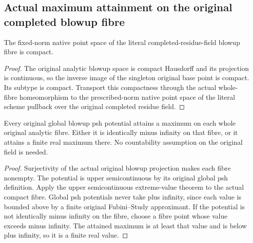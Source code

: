 \subsection{Actual maximum attainment on the original completed blowup fibre}

\begin{lemma}
\label{lem:fc-whole-completed-fibre-compact}
\leanok
The fixed-norm native point space of the literal completed-residue-field
blowup fibre is compact.
\end{lemma}
\begin{proof}
The original analytic blowup space is compact Hausdorff and its projection is
continuous, so the inverse image of the singleton original base point is
compact. Its subtype is compact. Transport this compactness through the
actual whole-fibre homeomorphism to the prescribed-norm native point space
of the literal scheme pullback over the original completed residue field.
\end{proof}

\begin{lemma}
\label{lem:fc-original-fibre-finite-maximum-attainment}
\leanok
Every original global blowup psh potential attains a maximum on each whole
original analytic fibre. Either it is identically minus infinity on that
fibre, or it attains a finite real maximum there. No countability assumption
on the original field is needed.
\end{lemma}
\begin{proof}
Surjectivity of the actual original blowup projection makes each fibre
nonempty. The potential is upper semicontinuous by its original global psh
definition. Apply the upper semicontinuous extreme-value theorem to the actual
compact fibre. Global psh potentials never take plus infinity, since each
value is bounded above by a finite original Fubini--Study approximant.
If the potential is not identically minus infinity on the fibre, choose a
fibre point whose value exceeds minus infinity. The attained maximum is at
least that value and is below plus infinity, so it is a finite real value.
\end{proof}

